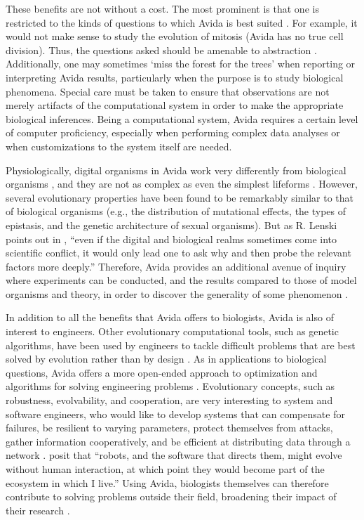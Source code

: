 \begin{doublespace}
These benefits are not without a cost.
%
The most prominent is that one is restricted to the kinds of questions
to which Avida is best suited \citep{wil02}.
%
For example, it would not make sense to study
the evolution of mitosis (Avida has no true cell division).
%
Thus, the questions asked should be amenable to abstraction \citep{wil02}.
%
Additionally, one may sometimes `miss the forest for the trees'
when reporting or interpreting Avida results,
particularly when the purpose is to study biological phenomena.
%
Special care must be taken to ensure that observations
are not merely artifacts of the computational system
in order to make the appropriate biological inferences.
%
Being a computational system, Avida requires a certain level
of computer proficiency, especially when performing complex data analyses
or when customizations to the system itself are needed.



Physiologically, digital organisms in Avida work very differently
from biological organisms \citep{yed01},
and they are not as complex as even the simplest lifeforms \citep{len01}.
%
However, several evolutionary properties have been found
to be remarkably similar to that of biological organisms
\citep{yed01,wil02,ada06}
(e.g., the distribution of mutational effects, the types of epistasis,
and the genetic architecture of sexual organisms).
%
But as R. Lenski points out in \citet{one03},
``even if the digital and biological realms sometimes come
into scientific conflict, it would only lead one to ask why
and then probe the relevant factors more deeply.''
%
Therefore, Avida provides an additional avenue of inquiry
where experiments can be conducted, and the results compared
to those of model organisms and theory,
in order to discover the generality of some phenomenon \citep{wil02}.



In addition to all the benefits that Avida offers to biologists,
Avida is also of interest to engineers.
%
Other evolutionary computational tools, such as genetic algorithms,
have been used by engineers to tackle difficult problems
that are best solved by evolution rather than by design \citep{mck08}.
%
As in applications to biological questions,
Avida offers a more open-ended approach to optimization and
algorithms for solving engineering problems \citep{mck08}.
%
Evolutionary concepts, such as robustness, evolvability, and cooperation,
are very interesting to system and software engineers,
who would like to develop systems that can compensate for failures,
be resilient to varying parameters, protect themselves from attacks,
gather information cooperatively,
and be efficient at distributing data through a network
\citep{bec07,mck08,gol08,kno09,kno11}.
%
\citet{wil02} posit that ``robots, and the software that directs them,
might evolve without human interaction, at which point they would become
part of the ecosystem in which I live.''
%
Using Avida, biologists themselves can therefore contribute to solving problems
outside their field, broadening their impact of their research \citep{one03}.




\end{doublespace}
